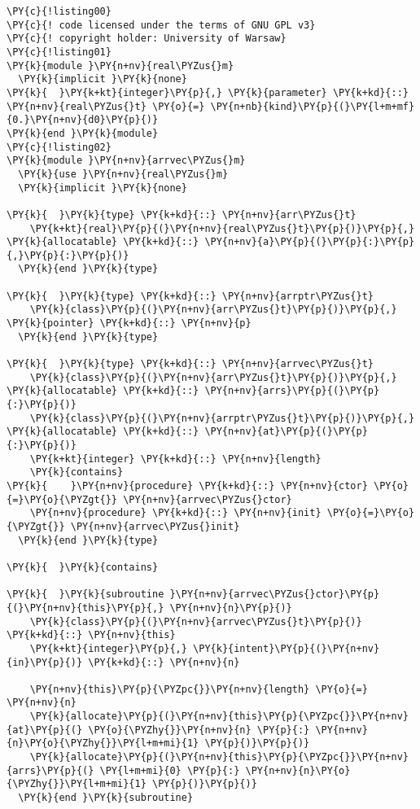 \begin{Verbatim}[commandchars=\\\{\}]
\PY{c}{!listing00}
\PY{c}{! code licensed under the terms of GNU GPL v3}
\PY{c}{! copyright holder: University of Warsaw}
\PY{c}{!listing01}
\PY{k}{module }\PY{n+nv}{real\PYZus{}m}
  \PY{k}{implicit }\PY{k}{none}
\PY{k}{  }\PY{k+kt}{integer}\PY{p}{,} \PY{k}{parameter} \PY{k+kd}{::} \PY{n+nv}{real\PYZus{}t} \PY{o}{=} \PY{n+nb}{kind}\PY{p}{(}\PY{l+m+mf}{0.}\PY{n+nv}{d0}\PY{p}{)} 
\PY{k}{end }\PY{k}{module}
\PY{c}{!listing02}
\PY{k}{module }\PY{n+nv}{arrvec\PYZus{}m}
  \PY{k}{use }\PY{n+nv}{real\PYZus{}m}
  \PY{k}{implicit }\PY{k}{none}

\PY{k}{  }\PY{k}{type} \PY{k+kd}{::} \PY{n+nv}{arr\PYZus{}t}
    \PY{k+kt}{real}\PY{p}{(}\PY{n+nv}{real\PYZus{}t}\PY{p}{)}\PY{p}{,} \PY{k}{allocatable} \PY{k+kd}{::} \PY{n+nv}{a}\PY{p}{(}\PY{p}{:}\PY{p}{,}\PY{p}{:}\PY{p}{)}
  \PY{k}{end }\PY{k}{type}

\PY{k}{  }\PY{k}{type} \PY{k+kd}{::} \PY{n+nv}{arrptr\PYZus{}t}
    \PY{k}{class}\PY{p}{(}\PY{n+nv}{arr\PYZus{}t}\PY{p}{)}\PY{p}{,} \PY{k}{pointer} \PY{k+kd}{::} \PY{n+nv}{p}
  \PY{k}{end }\PY{k}{type}

\PY{k}{  }\PY{k}{type} \PY{k+kd}{::} \PY{n+nv}{arrvec\PYZus{}t}
    \PY{k}{class}\PY{p}{(}\PY{n+nv}{arr\PYZus{}t}\PY{p}{)}\PY{p}{,} \PY{k}{allocatable} \PY{k+kd}{::} \PY{n+nv}{arrs}\PY{p}{(}\PY{p}{:}\PY{p}{)}
    \PY{k}{class}\PY{p}{(}\PY{n+nv}{arrptr\PYZus{}t}\PY{p}{)}\PY{p}{,} \PY{k}{allocatable} \PY{k+kd}{::} \PY{n+nv}{at}\PY{p}{(}\PY{p}{:}\PY{p}{)}
    \PY{k+kt}{integer} \PY{k+kd}{::} \PY{n+nv}{length}
    \PY{k}{contains}
\PY{k}{    }\PY{n+nv}{procedure} \PY{k+kd}{::} \PY{n+nv}{ctor} \PY{o}{=}\PY{o}{\PYZgt{}} \PY{n+nv}{arrvec\PYZus{}ctor}
    \PY{n+nv}{procedure} \PY{k+kd}{::} \PY{n+nv}{init} \PY{o}{=}\PY{o}{\PYZgt{}} \PY{n+nv}{arrvec\PYZus{}init}
  \PY{k}{end }\PY{k}{type}

\PY{k}{  }\PY{k}{contains}

\PY{k}{  }\PY{k}{subroutine }\PY{n+nv}{arrvec\PYZus{}ctor}\PY{p}{(}\PY{n+nv}{this}\PY{p}{,} \PY{n+nv}{n}\PY{p}{)}
    \PY{k}{class}\PY{p}{(}\PY{n+nv}{arrvec\PYZus{}t}\PY{p}{)} \PY{k+kd}{::} \PY{n+nv}{this}
    \PY{k+kt}{integer}\PY{p}{,} \PY{k}{intent}\PY{p}{(}\PY{n+nv}{in}\PY{p}{)} \PY{k+kd}{::} \PY{n+nv}{n}

    \PY{n+nv}{this}\PY{p}{\PYZpc{}}\PY{n+nv}{length} \PY{o}{=} \PY{n+nv}{n}
    \PY{k}{allocate}\PY{p}{(}\PY{n+nv}{this}\PY{p}{\PYZpc{}}\PY{n+nv}{at}\PY{p}{(} \PY{o}{\PYZhy{}}\PY{n+nv}{n} \PY{p}{:} \PY{n+nv}{n}\PY{o}{\PYZhy{}}\PY{l+m+mi}{1} \PY{p}{)}\PY{p}{)}
    \PY{k}{allocate}\PY{p}{(}\PY{n+nv}{this}\PY{p}{\PYZpc{}}\PY{n+nv}{arrs}\PY{p}{(} \PY{l+m+mi}{0} \PY{p}{:} \PY{n+nv}{n}\PY{o}{\PYZhy{}}\PY{l+m+mi}{1} \PY{p}{)}\PY{p}{)}
  \PY{k}{end }\PY{k}{subroutine}


\end{Verbatim}
